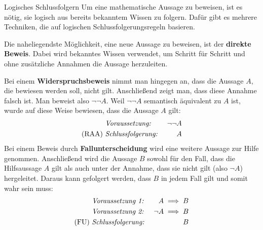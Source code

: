 \documentclass[../../main.tex]{subfiles}
\begin{document}
\begin{nutshell}{Logisches Schlussfolgern}
    Um eine mathematische Aussage zu beweisen, ist es nötig, sie logisch aus bereits bekanntem Wissen zu folgern. Dafür gibt es mehrere Techniken, die auf logischen Schlussfolgerungsregeln basieren.

    Die naheliegendste Möglichkeit, eine neue Aussage zu beweisen, ist der \textbf{direkte Beweis}. Dabei wird bekanntes Wissen verwendet, um Schritt für Schritt und ohne zusätzliche Annahmen die Aussage herzuleiten.

    Bei einem \textbf{Widerspruchsbeweis} nimmt man hingegen an, dass die Aussage $A$, die bewiesen werden soll, nicht gilt. Anschließend zeigt man, dass diese Annahme falsch ist. Man beweist also $\lnot\lnot A$. Weil $\lnot\lnot A$ semantisch äquivalent zu $A$ ist, wurde auf diese Weise bewiesen, dass die Aussage $A$ gilt:
    \begin{align*}
        &\text{\emph{Voraussetzung:}}~&\lnot\lnot A\\
        \text{(RAA)}~&\text{\emph{Schlussfolgerung:}}~&A
    \end{align*}
    Bei einem Beweis durch \textbf{Fallunterscheidung} wird eine weitere Aussage zur Hilfe genommen. Anschließend wird die Aussage $B$ sowohl für den Fall, dass die Hilfsaussage $A$ gilt als auch unter der Annahme, dass sie nicht gilt (also $\lnot A$) hergeleitet. Daraus kann gefolgert werden, dass $B$ in jedem Fall gilt und somit wahr sein muss:
    \begin{align*}
        &\text{\emph{Voraussetzung~1:}}~&A \implies B\\
        &\text{\emph{Voraussetzung~2:}}~&\lnot A \implies B\\
        \text{(FU)}~&\text{\emph{Schlussfolgerung:}}~&B
    \end{align*}
\end{nutshell}
\end{document}
